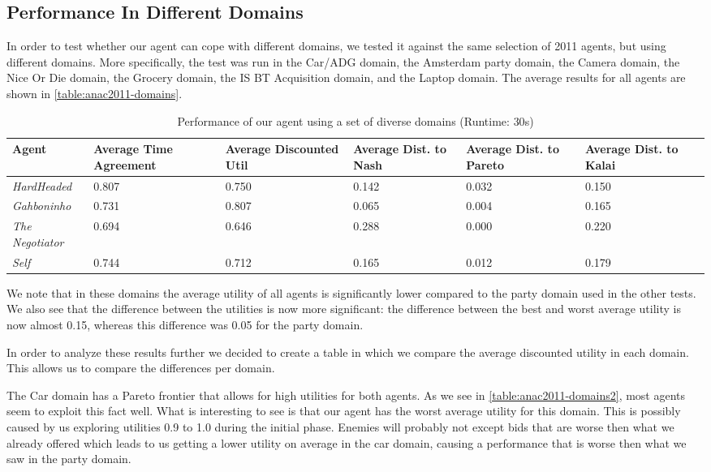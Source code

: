 \subsection{Performance In Different Domains}
In order to test whether our agent can cope with different domains, we tested it against the same selection of 2011 agents, but using different domains. More specifically, the test was run in the Car/ADG domain, the Amsterdam party domain, the Camera domain, the Nice Or Die domain, the Grocery domain, the IS BT Acquisition  domain, and the Laptop domain. The average results for all agents are shown in \autoref{table:anac2011-domains}.
\begin{table}[H]
  \centering
  \small
  \begin{tabular}{m{2cm}m{2cm}m{2cm}m{2cm}m{2cm}m{2cm}m{2cm}}
  \toprule
    Agent                     & Average Time Agreement & Average Discounted Util & Average Dist. to Nash & Average Dist. to Pareto & Average Dist. to Kalai \\
    \midrule
    \emph{HardHeaded}     & 0.807 & 0.750 & 0.142 & 0.032 & 0.150 \\ 
    \emph{Gahboninho}     & 0.731 & 0.807 & 0.065 & 0.004 & 0.165 \\ 
    \emph{The Negotiator} & 0.694 & 0.646 & 0.288 & 0.000 & 0.220 \\ 
    \emph{Self}           & 0.744 & 0.712 & 0.165 & 0.012 & 0.179 \\ 
    \bottomrule
  \end{tabular}
 \caption{Performance of our agent using a set of diverse domains (Runtime: $30$s) \label{table:anac2011-domains}}
\end{table}
We note that in these domains the average utility of all agents is significantly lower compared to the party domain used in the other tests. We also see that the difference between the utilities is now more significant: the difference between the best and worst average utility is now almost 0.15, whereas this difference was 0.05 for the party domain. 

In order to analyze these results further we decided to create a table in which we compare the average discounted utility in each domain. This allows us to compare the differences per domain. 

The Car domain has a Pareto frontier that allows for high utilities for both agents. As we see in \autoref{table:anac2011-domains2}, most agents seem to exploit this fact well. What is interesting to see is that our agent has the worst average utility for this domain. This is possibly caused by us exploring utilities 0.9 to 1.0 during the initial phase. Enemies will probably not except bids that are worse then what we already offered which leads to us getting a lower utility on average in the car domain, causing a performance that is worse then what we saw in the party domain.

